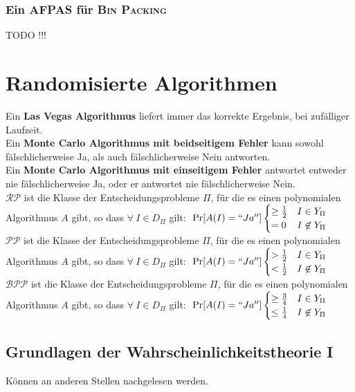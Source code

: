 \documentclass[a4paper,10pt]{scrartcl}
\newcommand{\tbf}{\textbf}
\newcommand{\tsc}{\textsc}
\newcommand{\RP}{\mathcal{RP}}
\newcommand{\PP}{\mathcal{PP}}
\newcommand{\BPP}{\mathcal{BPP}}
\renewcommand{\Pr}{\text{Pr}}
\begin{document}
\subsubsection{Ein AFPAS für \tsc{Bin Packing}}

TODO !!! \\

\newpage
\section{Randomisierte Algorithmen}
Ein \tbf{Las Vegas Algorithmus} liefert immer das korrekte Ergebnis, bei zufälliger Laufzeit. \\

Ein \tbf{Monte Carlo Algorithmus mit beidseitigem Fehler} kann sowohl fälschlicherweise Ja, als auch fälschlicherweise Nein antworten. \\

Ein \tbf{Monte Carlo Algorithmus mit einseitigem Fehler} antwortet entweder nie fälschlicherweise Ja, oder er antwortet nie fälschlicherweise Nein. \\

\tbf{$\RP$} ist die Klasse der Entscheidungsprobleme $\Pi$, für die es einen polynomialen Algorithmus $A$ gibt, so dass $\forall \ I \in D_\Pi$ gilt: $\ \Pr[A(I) = ``Ja''] \begin{cases} \geq \frac{1}{2} & I \in Y_\Pi \\ = 0 & I \not \in Y_\Pi \end{cases}$ \\

\tbf{$\PP$} ist die Klasse der Entscheidungsprobleme $\Pi$, für die es einen polynomialen Algorithmus $A$ gibt, so dass $\forall \ I \in D_\Pi$ gilt: $\ \Pr[A(I) = ``Ja''] \begin{cases} > \frac{1}{2} & I \in Y_\Pi \\ < \frac{1}{2} & I \not \in Y_\Pi \end{cases}$ \\

\tbf{$\BPP$} ist die Klasse der Entscheidungsprobleme $\Pi$, für die es einen polynomialen Algorithmus $A$ gibt, so dass $\forall \ I \in D_\Pi$ gilt: $\ \Pr[A(I) = ``Ja''] \begin{cases} \geq \frac{3}{4} & I \in Y_\Pi \\ \leq \frac{1}{4} & I \not \in Y_\Pi \end{cases}$ \\

\subsection{Grundlagen der Wahrscheinlichkeitstheorie I}
Können an anderen Stellen nachgelesen werden. \\
\end{document}
